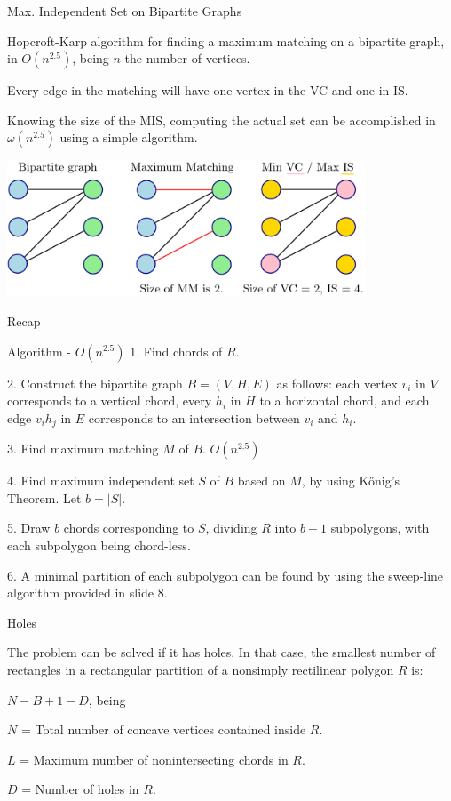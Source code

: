 \documentclass{beamer}
\begin{document}
\begin{frame}[t, shrink=10]{Max. Independent Set on Bipartite Graphs}

Hopcroft-Karp algorithm for finding a maximum matching on a bipartite graph, in $O(n^{2.5})$, being $n$ the number of vertices.

	Every edge in the matching will have one vertex in the VC and one in IS. 

	Knowing the size of the MIS, computing the actual set can be accomplished in $\omega(n^{2.5})$ using a simple algorithm.
	\vspace{10px}

	\centering
    \includegraphics[width=0.8\textwidth]{mis.png}


\end{frame}

\begin{frame}[t, shrink=10]{Recap}

	\begin{block}{Algorithm - $O(n^{2.5})$}
	1. Find chords of $R$.
	
	2. Construct the bipartite graph $B = (V, H, E)$ as follows: each vertex $v_i$ in $V$ corresponds to a vertical chord, every $h_i$ in $H$ to a horizontal chord, and each edge $v_i h_j$ in $E$ corresponds to an intersection between $v_i$ and $h_i$.

	3. Find maximum matching $M$ of $B$. $O(n^{2.5})$
	
	4. Find maximum independent set $S$ of $B$ based on $M$, by using Kőnig's Theorem. Let $b = |S|$.

	5. Draw $b$ chords corresponding to $S$, dividing $R$ into $b + 1$ subpolygons, with each subpolygon being chord-less.
	
	6. A minimal partition of each subpolygon can be found by using the sweep-line algorithm provided in slide 8.
		\end{block}
\end{frame}


\begin{frame}[t]{Holes}

	The problem can be solved if it has holes. In that case, the smallest number of rectangles in a rectangular partition of a nonsimply rectilinear polygon $R$ is:

	\begin{center}
		$N - B + 1 - D$, being 
	\end{center}
	
	$N$ = Total number of concave vertices contained inside $R$. 

	$L$ = Maximum number of nonintersecting chords in $R$. 

	$D$ = Number of holes in $R$. 

\end{frame}
\end{document}
